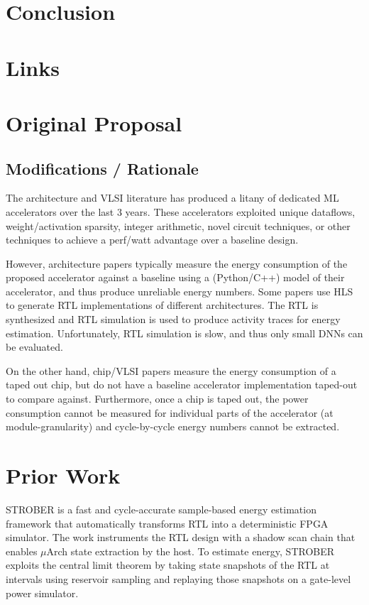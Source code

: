 \documentclass[sigconf]{acmart}
\begin{document}
\section{Conclusion}

\appendix
\section{Links}

\section{Original Proposal}

\subsection{Modifications / Rationale}


The architecture and VLSI literature has produced a litany of dedicated ML accelerators over the last 3 years.
These accelerators exploited unique dataflows, weight/activation sparsity, integer arithmetic, novel circuit techniques, or other techniques to achieve a perf/watt advantage over a baseline design.

However, architecture papers typically measure the energy consumption of the proposed accelerator against a baseline using a (Python/C++) model of their accelerator, and thus produce unreliable energy numbers.
Some papers use HLS to generate RTL implementations of different architectures.
The RTL is synthesized and RTL simulation is used to produce activity traces for energy estimation.
Unfortunately, RTL simulation is slow, and thus only small DNNs can be evaluated.

On the other hand, chip/VLSI papers measure the energy consumption of a taped out chip, but do not have a baseline accelerator implementation taped-out to compare against.
Furthermore, once a chip is taped out, the power consumption cannot be measured for individual parts of the accelerator (at module-granularity) and cycle-by-cycle energy numbers cannot be extracted.

\section{Prior Work}
STROBER\cite{strober} is a fast and cycle-accurate sample-based energy estimation framework that automatically transforms RTL into a deterministic FPGA simulator.
The work instruments the RTL design with a shadow scan chain that enables $\mu$Arch state extraction by the host.
To estimate energy, STROBER exploits the central limit theorem by taking state snapshots of the RTL at intervals using reservoir sampling and replaying those snapshots on a gate-level power simulator.
\end{document}

